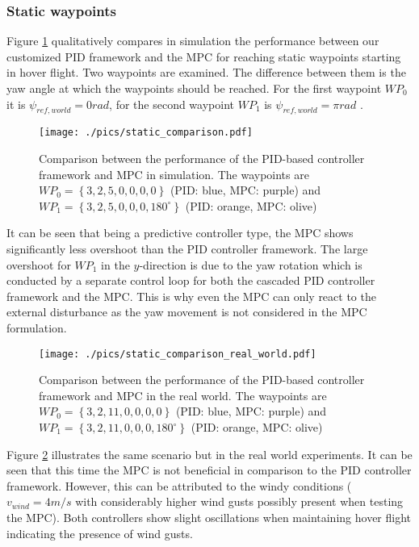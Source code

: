 \subsubsection{Static waypoints}
Figure \ref{fig:static_waypoints_sim} qualitatively compares in simulation the performance between our customized PID framework and the MPC for reaching static waypoints starting in hover flight. Two waypoints are examined. The difference between them is the yaw angle at which the waypoints should be reached. For the first waypoint $WP_0$ it is $\psi_{ref,world} = 0\si{rad}$, for the second waypoint $WP_1$ is $\psi_{ref,world} = \pi\si{rad}$ .
\begin{figure}[thpb]
      \centering
		\texttt{[image: ./pics/static\_comparison.pdf]}
\caption{Comparison between the performance of the PID-based controller framework and MPC in simulation. The waypoints are $WP_0=\left\lbrace 3,2,5,0,0,0,0\right\rbrace$ (PID: blue, MPC: purple) and $WP_1=\left\lbrace 3,2,5,0,0,0,180^{\circ}\right\rbrace$  (PID: orange, MPC: olive)}
\label{fig:static_waypoints_sim}
 \end{figure}
It can be seen that being a predictive controller type, the MPC shows significantly less overshoot than the PID controller framework. The large overshoot for $WP_{1}$ in the $y$-direction is due to the yaw rotation which is conducted by a separate control loop for both the cascaded PID controller framework and the MPC. This is why even the MPC can only react to the external disturbance as the yaw movement is not considered in the MPC formulation.
\begin{figure}[thpb]
      \centering
		\texttt{[image: ./pics/static\_comparison\_real\_world.pdf]}
\caption{Comparison between the performance of the PID-based controller framework and MPC in the real world. The waypoints are $WP_0=\left\lbrace 3,2,11,0,0,0,0\right\rbrace$ (PID: blue, MPC: purple) and $WP_1=\left\lbrace 3,2,11,0,0,0,180^{\circ}\right\rbrace$  (PID: orange, MPC: olive)}
\label{fig:static_waypoints_real}
 \end{figure}
 Figure \ref{fig:static_waypoints_real} illustrates the same scenario but in  the real world experiments. It can be seen that this time the MPC is not beneficial in comparison to the PID controller framework. However, this can be attributed to the windy conditions ($v_{wind} = 4\si{m/s}$ with considerably higher wind gusts possibly present when testing the MPC). Both controllers show slight oscillations when maintaining hover flight indicating the presence of wind gusts.
